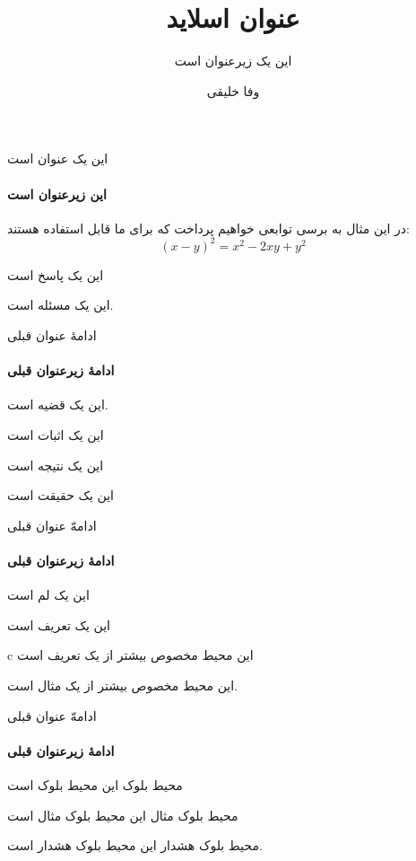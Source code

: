 \documentclass{bidibeamer}
\title{عنوان اسلاید}
\subtitle{این یک زیرعنوان است}
\author{وفا خلیقی}
\institute{دانشگاه تهران}
\begin{document}
\begin{frame}
\titlepage
\end{frame}

\begin{frame}{این یک عنوان است}
\framesubtitle{این زیرعنوان است}
\begin{bidiexample}
در این مثال به برسی توابعی خواهیم پرداخت که برای ما قابل استفاده هستند:
\begin{equation}
(x-y)^2=x^2-2xy+y^2
\end{equation}
\end{bidiexample}
\begin{bidisolution}
این یک پاسخ است
\end{bidisolution}
\begin{bidiproblem}
این یک مسئله است.
\end{bidiproblem}
\end{frame}
\begin{frame}{ادامهٔ عنوان قبلی}
\framesubtitle{ادامهٔ زیرعنوان قبلی}
\begin{biditheorem}
این یک قضیه است.
\end{biditheorem}
\begin{bidiproof}
این یک اثبات است
\end{bidiproof}
\begin{bidicorollary}
این یک نتیجه است
\end{bidicorollary}
\begin{bidifact}
این یک حقیقت است
\end{bidifact}
\end{frame}
\begin{frame}{ادامهّ عنوان قبلی}
\framesubtitle{ادامهٔ زیرعنوان قبلی}
\begin{bidilemma}
این یک لم است
\end{bidilemma}
\begin{bididefinition}
این یک تعریف است
\end{bididefinition}
\begin{bididefinitions}c
این محیط مخصوص بیشتر از یک تعریف است
\end{bididefinitions}
\begin{bidiexamples}
این محیط مخصوص بیشتر از یک مثال است.
\end{bidiexamples}
\end{frame}
\begin{frame}{ادامهّ عنوان قبلی}
\framesubtitle{ادامهٔ زیرعنوان قبلی}
\begin{bidiblock}{محیط بلوک}
این محیط بلوک است
\end{bidiblock}
\begin{bidiexampleblock}{محیط بلوک مثال}
این محیط بلوک مثال است
\end{bidiexampleblock}
\begin{bidialertblock}{محیط بلوک هشدار}
این محیط بلوک هشدار است.
\end{bidialertblock}
\end{frame}
\end{document}
